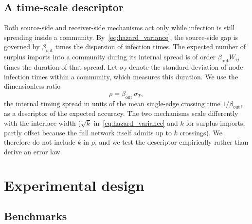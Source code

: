 \documentclass[a4paper,fleqn]{cas-sc}
\begin{document}
\subsection{A time-scale descriptor}
\label{sec:descriptor}

Both source-side and receiver-side mechanisms act only while infection is still spreading inside a community. By~\eqref{eq:hazard_variance}, the source-side gap is governed by $\beta_{\mathrm{out}}$ times the dispersion of infection times. The expected number of surplus imports into a community during its internal spread is of order $\beta_{\mathrm{out}}W_{ij}$ times the duration of that spread. Let $\sigma_T$ denote the standard deviation of node infection times within a community, which measures this duration. We use the dimensionless ratio
\begin{equation}
\label{eq:rho}
\rho=\beta_{\mathrm{out}}\,\sigma_T,
\end{equation}
the internal timing spread in units of the mean single-edge crossing time $1/\beta_{\mathrm{out}}$, as a descriptor of the expected accuracy. The two mechanisms scale differently with the interface width ($\sqrt{k}$ in~\eqref{eq:hazard_variance} and $k$ for surplus imports, partly offset because the full network itself admits up to $k$ crossings). We therefore do not include $k$ in $\rho$, and we test the descriptor empirically rather than derive an error law.

\clearpage
\section{Experimental design}
\label{sec:design}

\subsection{Benchmarks}
\end{document}
